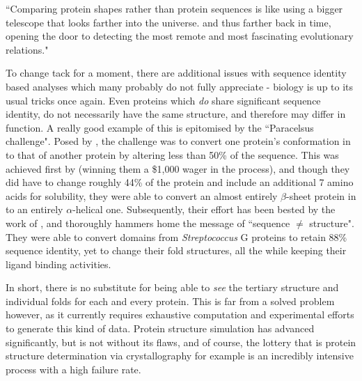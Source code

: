 \begin{displayquote}
``Comparing protein shapes rather than protein sequences is like using a bigger telescope that looks farther into the universe. and thus farther back in time, opening the door to detecting the most remote and most fascinating evolutionary relations."
\end{displayquote}

To change tack for a moment, there are additional issues with sequence identity based analyses which many probably do not fully appreciate - biology is up to its usual tricks once again. Even proteins which \emph{do} share significant sequence identity, do not necessarily have the same structure, and therefore may differ in function. A really good example of this is epitomised by the ``Paracelsus challenge". Posed by \cite{Rose1994}, the challenge was to convert one protein's conformation in to that of another protein by altering less than 50\% of the sequence. This was achieved first by \cite{Dalal1997} (winning them a \$1,000 wager in the process), and though they did have to change roughly 44\% of the protein and include an additional 7 amino acids for solubility, they were able to convert an almost entirely $\beta$-sheet protein in to an entirely $\alpha$-helical one. Subsequently, their effort has been bested by the work of \cite{Alexander2007}, and thoroughly hammers home the message of ``sequence $\neq$ structure". They were able to convert domains from \emph{Streptococcus} G proteins to retain 88\% sequence identity, yet to change their fold structures, all the while keeping their ligand binding activities.

In short, there is no substitute for being able to \emph{see} the tertiary structure and individual folds for each and every protein. This is far from a solved problem however, as it currently requires exhaustive computation and experimental efforts to generate this kind of data. Protein structure simulation has advanced significantly, but is not without its flaws, and of course, the lottery that is protein structure determination via crystallography for example is an incredibly intensive process with a high failure rate. 


